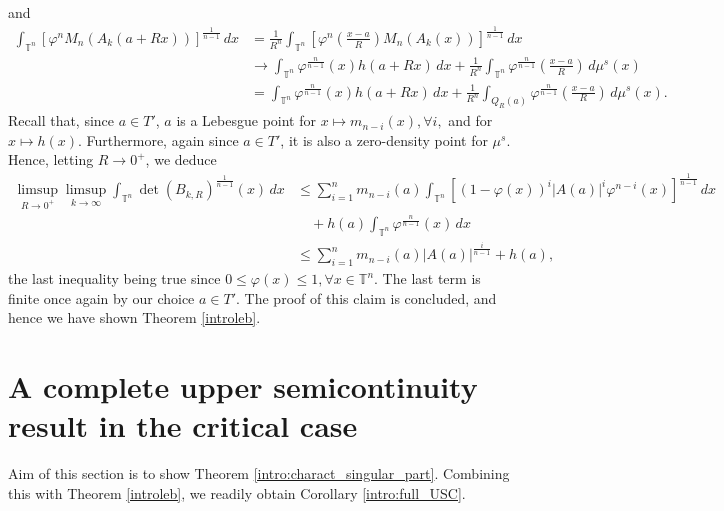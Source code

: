 \documentclass[10pt,reqno]{amsart}
\numberwithin{equation}{section}
\newcommand{\T}{\mathbb{T}}
\theoremstyle{plain}
\theoremstyle{definition}
\theoremstyle{remark}
\begin{document}
and
\begin{align*}
\int_{\T^n}\left[\varphi^{n }M_{n }(A_k(a + Rx))\right]^{\frac{1}{ n -1}}\,dx &= \frac{1}{R^n}\int_{\T^n}\left[\varphi^{n }\left(\frac{x-a}{R}\right)M_{n}(A_k(x))\right]^{\frac{1}{ n -1}}\,dx\\
& \to \int_{\T^n}\varphi^{\frac{n}{n - 1}}(x)h(a+Rx)\,dx+\frac{1}{R^n}\int_{\T^n} \varphi^\frac{n}{n-1}\left(\frac{x-a}{R}\right)\,d\mu^s(x)\\
& = \int_{\T^n}\varphi^{\frac{n}{n - 1}}(x)h(a+Rx)\,dx+\frac{1}{R^n}\int_{Q_R(a)} \varphi^\frac{n}{n-1}\left(\frac{x-a}{R}\right)\,d\mu^s(x).
\end{align*}
Recall that, since $a \in T'$, $a$ is a Lebesgue point for $x \mapsto m_{n-i}(x), \forall i,$ and for $x \mapsto h(x)$. Furthermore, again since $a \in T'$, it is also a zero-density point for $\mu^s$. Hence, letting $R \to 0^+$, we deduce
\begin{align*}
\limsup_{R\to 0^+}\limsup_{k \to \infty}\int_{\T^n}\det(B_{k,R})^{\frac{1}{n - 1}}(x)\,dx &\leq \sum_{i = 1}^n m_{n-i}(a)\int_{\T^n}\left[(1 - \varphi(x))^i|A(a)|^i\varphi^{n - i}(x)\right]^{\frac{1}{ n -1}}\,dx\\
&\quad+h(a)\int_{\T^n} \varphi^{\frac{n}{n-1}} (x)\,dx\\
& \le \sum_{i = 1}^n m_{n-i}(a)|A(a)|^{\frac{i}{n-1}} + h(a),
\end{align*}
the last inequality being true since $0 \le\varphi(x) \le 1, \forall x \in \T^n$. The last term is finite once again by our choice $a\in T'$. The proof of this claim is concluded, and hence we have shown Theorem \ref{introleb}.


\section{A complete upper semicontinuity result in the critical case}\label{charac}

Aim of this section is to show Theorem \ref{intro:charact_singular_part}. Combining this with Theorem \ref{introleb}, we readily obtain Corollary \ref{intro:full_USC}.
\end{document}

